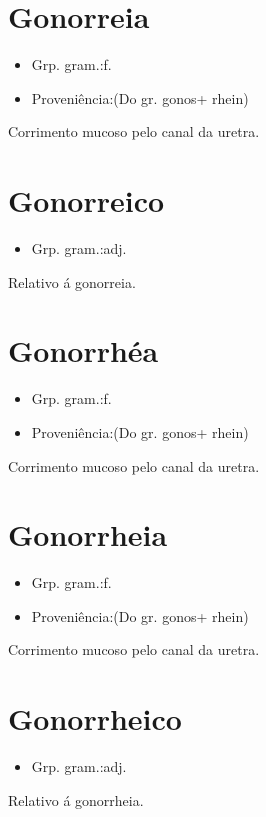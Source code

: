 \section{Gonorreia}
\begin{itemize}
\item {Grp. gram.:f.}
\end{itemize}
\begin{itemize}
\item {Proveniência:(Do gr. \textunderscore gonos\textunderscore  + \textunderscore rhein\textunderscore )}
\end{itemize}
Corrimento mucoso pelo canal da uretra.
\section{Gonorreico}
\begin{itemize}
\item {Grp. gram.:adj.}
\end{itemize}
Relativo á gonorreia.
\section{Gonorrhéa}
\begin{itemize}
\item {Grp. gram.:f.}
\end{itemize}
\begin{itemize}
\item {Proveniência:(Do gr. \textunderscore gonos\textunderscore  + \textunderscore rhein\textunderscore )}
\end{itemize}
Corrimento mucoso pelo canal da uretra.
\section{Gonorrheia}
\begin{itemize}
\item {Grp. gram.:f.}
\end{itemize}
\begin{itemize}
\item {Proveniência:(Do gr. \textunderscore gonos\textunderscore  + \textunderscore rhein\textunderscore )}
\end{itemize}
Corrimento mucoso pelo canal da uretra.
\section{Gonorrheico}
\begin{itemize}
\item {Grp. gram.:adj.}
\end{itemize}
Relativo á gonorrheia.

